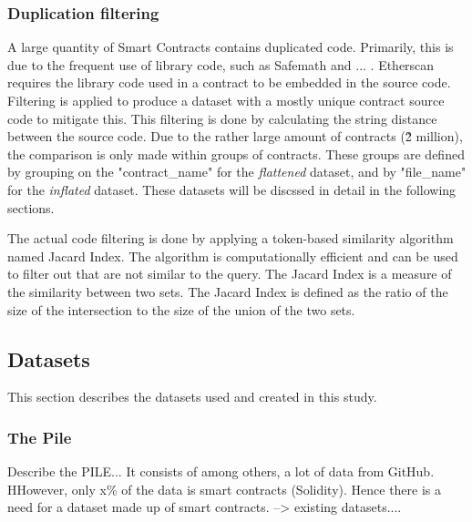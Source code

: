 \subsubsection{Duplication filtering}
\label{sec:duplication-filtering}
A large quantity of Smart Contracts contains duplicated code. Primarily, this is due to the frequent use of library code, such as Safemath and ... . Etherscan requires the library code used in a contract to be embedded in the source code. Filtering is applied to produce a dataset with a mostly unique contract source code to mitigate this. This filtering is done by calculating the string distance between the source code. Due to the rather large amount of contracts (\~2 million), the comparison is only made within groups of contracts. These groups are defined by grouping on the "contract\_name" for the \textit{flattened} dataset, and by "file\_name" for the \textit{inflated} dataset. These datasets will be discssed in detail in the following sections.

The actual code filtering is done by applying a token-based similarity algorithm named Jacard Index. The algorithm is computationally efficient and can be used to filter out  that are not similar to the query. The Jacard Index is a measure of the similarity between two sets. The Jacard Index is defined as the ratio of the size of the intersection to the size of the union of the two sets.


\subsection{Datasets}
\label{sec:datasets}
This section describes the datasets used and created in this study.

\subsubsection{The Pile}
\label{sec:the-pile}
Describe the  PILE...  It consists of among others, a lot of data from GitHub. HHowever, only x\% of the data is smart contracts (Solidity). Hence there is a need for a dataset made up of smart contracts. --> existing datasets....


